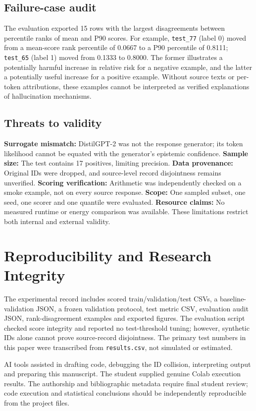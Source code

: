 \documentclass[manuscript,screen]{acmart}
\begin{document}
\subsection{Failure-case audit}
The evaluation exported 15 rows with the largest disagreements between percentile ranks of mean and P90 scores. For example, \texttt{test\_77} (label 0) moved from a mean-score rank percentile of 0.0667 to a P90 percentile of 0.8111; \texttt{test\_65} (label 1) moved from 0.1333 to 0.8000. The former illustrates a potentially harmful increase in relative risk for a negative example, and the latter a potentially useful increase for a positive example. Without source texts or per-token attributions, these examples cannot be interpreted as verified explanations of hallucination mechanisms.

\subsection{Threats to validity}
\textbf{Surrogate mismatch:} DistilGPT-2 was not the response generator; its token likelihood cannot be equated with the generator's epistemic confidence. \textbf{Sample size:} The test contains 17 positives, limiting precision. \textbf{Data provenance:} Original IDs were dropped, and source-level record disjointness remains unverified. \textbf{Scoring verification:} Arithmetic was independently checked on a smoke example, not on every source response. \textbf{Scope:} One sampled subset, one seed, one scorer and one quantile were evaluated. \textbf{Resource claims:} No measured runtime or energy comparison was available. These limitations restrict both internal and external validity.

\section{Reproducibility and Research Integrity}
The experimental record includes scored train/validation/test CSVs, a baseline-validation JSON, a frozen validation protocol, test metric CSV, evaluation audit JSON, rank-disagreement examples and exported figures. The evaluation script checked score integrity and reported no test-threshold tuning; however, synthetic IDs alone cannot prove source-record disjointness. The primary test numbers in this paper were transcribed from \texttt{results.csv}, not simulated or estimated.

AI tools assisted in drafting code, debugging the ID collision, interpreting output and preparing this manuscript. The student supplied genuine Colab execution results. The authorship and bibliographic metadata require final student review; code execution and statistical conclusions should be independently reproducible from the project files.
\end{document}
